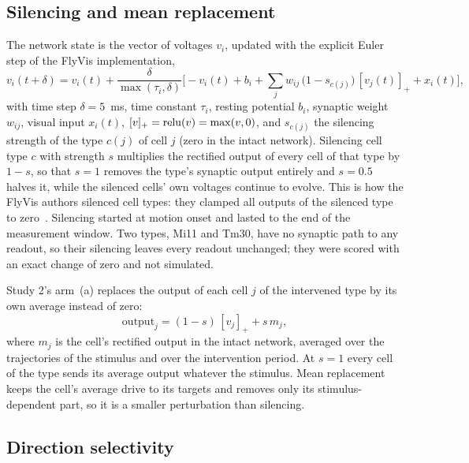 \subsection{Silencing and mean replacement}
\label{sec:interventions}

The network state is the vector of voltages $v_i$, updated with the explicit Euler step of the FlyVis implementation,
\begin{equation}
  v_i(t+\delta) = v_i(t) + \frac{\delta}{\max(\tau_i,\delta)}\Big[-v_i(t) + b_i + \sum_j w_{ij}\,\big(1-s_{c(j)}\big)\,[v_j(t)]_+ + x_i(t)\Big],
  \label{eq:dynamics}
\end{equation}
with time step $\delta=5$~ms, time constant $\tau_i$, resting potential $b_i$, synaptic weight $w_{ij}$, visual input $x_i(t)$, $[v]_+=\operatorname{relu}(v)=\max(v,0)$, and $s_{c(j)}$ the silencing strength of the type $c(j)$ of cell $j$ (zero in the intact network). Silencing cell type $c$ with strength $s$ multiplies the rectified output of every cell of that type by $1-s$, so that $s=1$ removes the type's synaptic output entirely and $s=0.5$ halves it, while the silenced cells' own voltages continue to evolve. This is how the FlyVis authors silenced cell types: they clamped all outputs of the silenced type to zero~\citep{lappalainen2024review}. Silencing started at motion onset and lasted to the end of the measurement window. Two types, Mi11 and Tm30, have no synaptic path to any readout, so their silencing leaves every readout unchanged; they were scored with an exact change of zero and not simulated.

Study 2's arm~(a) replaces the output of each cell $j$ of the intervened type by its own average instead of zero:
\begin{equation}
  \text{output}_j = (1-s)\,[v_j]_+ + s\,m_j ,
  \label{eq:mean}
\end{equation}
where $m_j$ is the cell's rectified output in the intact network, averaged over the \NTrajectories{} trajectories of the stimulus and over the intervention period. At $s=1$ every cell of the type sends its average output whatever the stimulus. Mean replacement keeps the cell's average drive to its targets and removes only its stimulus-dependent part, so it is a smaller perturbation than silencing.

\subsection{Direction selectivity}
\label{sec:dsi}

